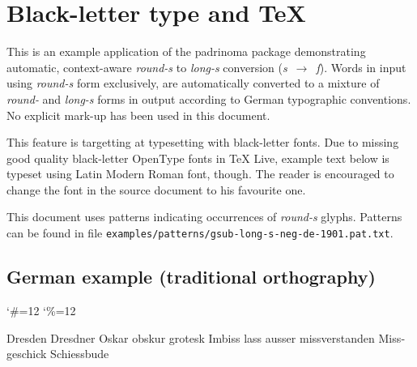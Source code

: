 \documentclass{article}
\begin{document}
\section{Black-letter type and \TeX}

This is an example application of the padrinoma package demonstrating
automatic, context-aware \emph{round-s} to \emph{long-s} conversion
(\emph{s}~$\rightarrow$~\emph{ſ}).  Words in input using \emph{round-s}
form exclusively, are automatically converted to a mixture
of \emph{round-} and \emph{long-s} forms in output according to German
typographic conventions.  No explicit mark-up has been used in this
document.

This feature is targetting at typesetting with black-letter fonts.  Due
to missing good quality black-letter OpenType fonts in TeX Live, example
text below is typeset using Latin Modern Roman font, though.  The reader
is encouraged to change the font in the source document to his favourite
one.

This document uses patterns indicating occurrences of \emph{round-s}
glyphs.  Patterns can be found in
file \texttt{examples/patterns/gsub-long-s-neg-de-1901.pat.txt}.


\subsection{German example (traditional orthography)}

\bgroup
\catcode`\#=12
\catcode`\%=12
\egroup

\begin{otherlanguage}{german}
Dresden Dresdner Oskar obskur grotesk Imbiss lass ausser missverstanden
Missgeschick Schiessbude

\end{otherlanguage}
\end{document}

